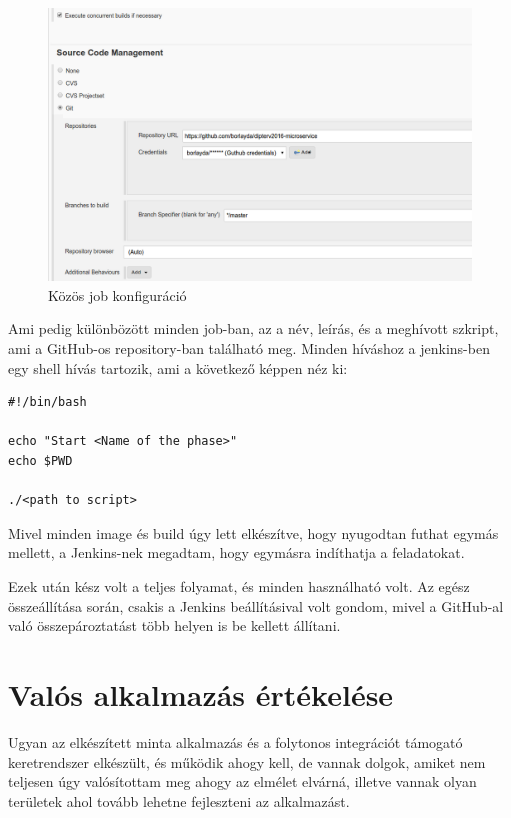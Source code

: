 \documentclass[11pt,magyar,a4paper,twoside,]{report}
\let\Oldincludegraphics\includegraphics
\renewcommand{\includegraphics}[1]{
\begin{adjustbox}{max size={\textwidth}{\textheight}}
    \Oldincludegraphics[scale=0.6]{#1}%
\end{adjustbox}
}
\begin{document}
\begin{figure}[H]
\centering
\includegraphics{img/common-job-conf}
\caption{Közös job konfiguráció\label{job-configuration}}
\end{figure}

Ami pedig különbözött minden job-ban, az a név, leírás, és a meghívott
szkript, ami a GitHub-os repository-ban található meg. Minden híváshoz a
jenkins-ben egy shell hívás tartozik, ami a következő képpen néz ki:

\begin{verbatim}
#!/bin/bash

echo "Start <Name of the phase>"
echo $PWD

./<path to script>
\end{verbatim}

Mivel minden image és build úgy lett elkészítve, hogy nyugodtan futhat
egymás mellett, a Jenkins-nek megadtam, hogy egymásra indíthatja a
feladatokat.

Ezek után kész volt a teljes folyamat, és minden használható volt. Az
egész összeállítása során, csakis a Jenkins beállításival volt gondom,
mivel a GitHub-al való összepároztatást több helyen is be kellett
állítani.

\chapter{Valós alkalmazás
értékelése}\label{valuxf3s-alkalmazuxe1s-uxe9rtuxe9keluxe9se}

Ugyan az elkészített minta alkalmazás és a folytonos integrációt
támogató keretrendszer elkészült, és működik ahogy kell, de vannak
dolgok, amiket nem teljesen úgy valósítottam meg ahogy az elmélet
elvárná, illetve vannak olyan területek ahol tovább lehetne fejleszteni
az alkalmazást.
\end{document}
